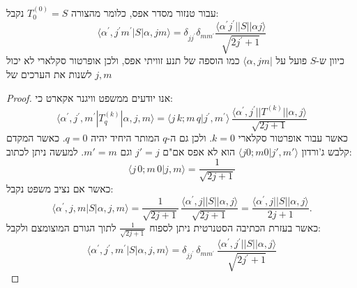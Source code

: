 \documentclass{tstextbook}
\begin{document}
\begin{corollary}
עבור טנזור מסדר אפס, כלומר מהצורה \(T_{0}^{(0)}=S\) נקבל:
$$\langle\alpha^{\prime},j^{\prime}m^{\prime}|S|\alpha,j m\rangle=\delta_{j j^{\prime}}\delta_{m m^{\prime}}\frac{\langle\alpha^{\prime}j^{\prime}||S||\alpha j\rangle}{\sqrt{2j^{\prime}+1}}$$
כיוון ש-\(S\) פועל על \(\langle  \alpha,jm|\) כמו הוספה של תנע זוויתי אפס, ולכן אופרטור סקלארי לא יכול לשנות את הערכים של \(j,m\)

\end{corollary}
\begin{proof}
אנו יודעים ממשפט וויגנר אקארט כי:
$$\langle\alpha^{\prime},j^{\prime},m^{\prime}|T_{q}^{(k)}|\alpha,j,m\rangle=\langle j\,k;m\,q|j^{\prime},m^{\prime}\rangle\,\frac{\langle\alpha^{\prime},j^{\prime}||T^{(k)}||\alpha,j\rangle}{\sqrt{2j+1}}$$
כאשר עבור אופרטור סקלארי \(k=0\). ולכן גם ה-\(q\) המותר היחיד יהיה \(q=0\). כאשר המקדם קלבש ג'ורדון \(\langle j 0;m 0|j',m' \rangle\) הוא לא אפס אם"ם \(j'=j\) וגם \(m'=m\). למעשה ניתן לכתוב:
$$\langle j\,0;m\,0|j,m\rangle=\frac{1}{\sqrt{2j+1}}$$
כאשר אם נציב משפט נקבל:
$$\langle\alpha^{\prime},j,m|S|\alpha,j,m\rangle=\frac{1}{\sqrt{2j+1}}\,\frac{\langle\alpha^{\prime},j||S||\alpha,j\rangle}{\sqrt{2j+1}}=\frac{\langle\alpha^{\prime},j||S||\alpha,j\rangle}{2j+1}.$$
כאשר בעזרת הכתיבה הסטנרטית ניתן לספוח \(\frac{1}{\sqrt{ 2j+1 }}\) לתוך הגורם המוצומצם ולקבל:
$$\langle\alpha^{\prime},j^{\prime},m^{\prime}|S|\alpha,j,m\rangle=\delta_{j j^{\prime}}\,\delta_{m m^{\prime}}\,\frac{\langle\alpha^{\prime},j^{\prime}||S||\alpha,j\rangle}{\sqrt{2j^{\prime}+1}}$$

\end{proof}
\end{document}
